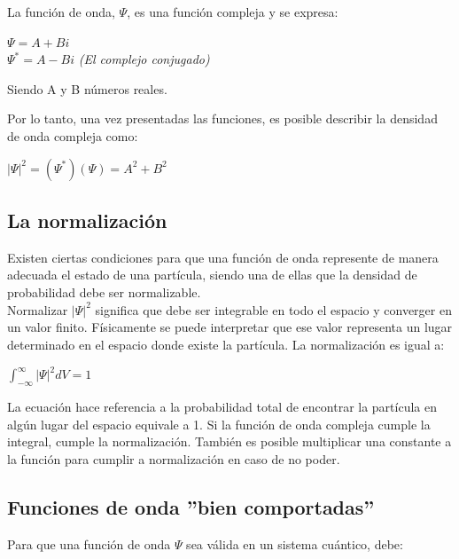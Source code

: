 \documentclass[a4paper]{article}
\begin{document}
        \indent La función de onda, $\Psi$, es una función compleja y se expresa:
    
        \begin{center}
            $\Psi = A + Bi$ \\
            $\Psi^* = A - Bi$ \hspace{5mm} \textit{(El complejo conjugado)} \\
        \end{center}

        Siendo A y B números reales.

        \indent Por lo tanto, una vez presentadas las funciones, es posible describir la densidad de onda compleja como:

        \begin{center}
            $|\Psi|^2 = (\Psi^*) (\Psi) = A^2 + B^2$
        \end{center}

    \subsection{La normalización}
        \indent Existen ciertas condiciones para que una función de onda represente de manera adecuada el estado de una partícula, siendo una de ellas que la densidad de probabilidad debe ser normalizable. \\
        \indent Normalizar $|\Psi|^2$ significa que debe ser integrable en todo el espacio y converger en un valor finito. Físicamente se puede interpretar que ese valor representa un lugar determinado en el espacio donde existe la partícula. La normalización es igual a:

        \begin{center}
            $\int_{- \infty}^{\infty} |\Psi|^2 dV = 1$ 
        \end{center}

        La ecuación hace referencia a la probabilidad total de encontrar la partícula en algún lugar del espacio equivale a 1. Si la función de onda compleja cumple la integral, cumple la normalización. También es posible multiplicar una constante a la función para cumplir a normalización en caso de no poder.

    \subsection{Funciones de onda ''bien comportadas''}
        \indent Para que una función de onda $\Psi$ sea válida en un sistema cuántico, debe:
\end{document}
